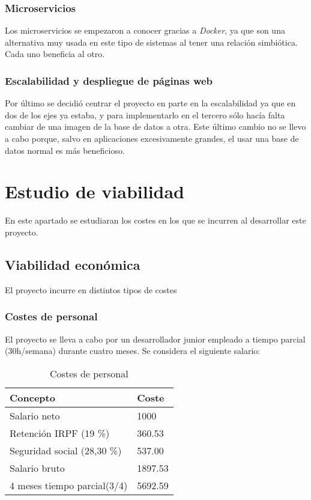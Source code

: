 \subsubsection{Microservicios}
Los microservicios se empezaron a conocer gracias a \emph{Docker}, ya que son una alternativa muy usada en este tipo de sistemas al tener una relación simbiótica. Cada uno beneficia al otro.

\subsubsection{Escalabilidad y despliegue de páginas web}
Por último se decidió centrar el proyecto en parte en la escalabilidad ya que en dos de los ejes ya estaba, y para implementarlo en el tercero sólo hacía falta cambiar de una imagen de la base de datos a otra. Este último cambio no se llevo a cabo porque, salvo en aplicaciones excesivamente grandes, el usar una base de datos normal es más beneficioso.

\section{Estudio de viabilidad}
En este apartado se estudiaran los costes en los que se incurren al desarrollar este proyecto.

\subsection{Viabilidad económica}
El proyecto incurre en distintos tipos de costes

\subsubsection{Costes de personal}
El proyecto se lleva a cabo por un desarrollador junior empleado a tiempo parcial (30h/semana) durante cuatro meses. Se considera el siguiente salario:

\begin{table}[]
\centering
\caption{Costes de personal}
\label{Salario}
\begin{tabular}{@{}ll@{}}
\toprule
Concepto & Coste \\ \midrule
Salario neto & 1000 \\
Retención IRPF (19 \%) & 360.53 \\
Seguridad social (28,30 \%) & 537.00 \\
Salario bruto & 1897.53 \\ \midrule
4 meses tiempo parcial(3/4) & 5692.59 \\ \bottomrule
\end{tabular}
\end{table}

